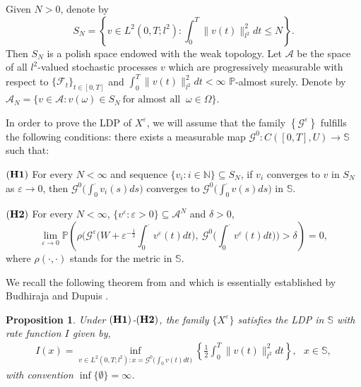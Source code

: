\documentclass[11pt]{article}
\numberwithin{equation}{section}
\theoremstyle{plain}
\newtheorem{prop}{Proposition}[section]
\def\leq{\leqslant}
\begin{document}
Given $N > 0$, denote by
\begin{equation*}
    S_N = \left\{v \in L^2(0,T; l^2): \int_{0}^T \|v(t)\|^2_{l^2} dt \leq N \right\}.
\end{equation*}
 Then $S_N$ is a polish space endowed with the weak topology.
 Let $\mathcal{A}$ be the space of all $l^2$-valued stochastic processes $v$
 which are progressively measurable with respect to $\{\mathcal{F}_t\}_{t\in [0,T]}$
 and $\int_{0}^{T} \|v(t)\|_{l^2}^2 dt < \infty$ $\mathbb{P}$-almost surely.
 Denote by
   $\mathcal{A}_N = \{ v \in \mathcal{A} : v(\omega) \in S_N\
                         \text{for almost all }\ \omega\in \Omega \}$.

 In order to prove the LDP
  of $X^\varepsilon$,
 we will assume that the family
    $\left\{\mathcal{G}^\varepsilon\right\}$
 fulfills the following conditions:
 there exists a measurable map $\mathcal{G}^0: C([0,T],U) \rightarrow \mathbb{S}$
 such that:


 $({\bf H1})$
    For every $N < \infty$ and
    sequence $\{v_i : i \in \mathbb{N} \} \subseteq S_N$,
    if   $v_i$ converges to
     $v$ in $ S_N$ as $\varepsilon \rightarrow 0$, then
       $\mathcal{G}^0 \big( \int_0^\cdot v_i(s) ds \big)$
    converges to
       $\mathcal{G}^0 \big( \int_0^\cdot v(s) ds \big)$
    in  $\mathbb{S}$.


 $({\bf H2})$
    For every $N < \infty$, $\{v^\varepsilon : \varepsilon > 0\} \subseteq \mathcal{A}^N$ and $\delta > 0$,
    $$ \lim_{\varepsilon \to 0}
             \mathbb{P}
                  \left( \rho
                             \Big( \mathcal{G}^\varepsilon
                                          \big( W + \varepsilon^{-\frac{1}{2}} \int_{0}^{\cdot} v^\varepsilon(t) dt
                                          \big), \
                                    \mathcal{G}^0
                                          \big( \int_{0}^{\cdot} v^\varepsilon(t) dt
                                          \big)
                             \Big) > \delta
                  \right)
        = 0,
    $$
 where $\rho(\cdot, \cdot)$ stands for the metric in  $\mathbb{S}$.


 We recall the following theorem
 from  \cite[Theorem 3.2]{msz2021AMO} and \cite[Theorem 4.4]{lszz2022PA}
 which is essentially   established by Budhiraja and Dupuis \cite[Theorem 4.4]{bd2000PMS}.

\begin{prop}\cite{msz2021AMO, lszz2022PA}\label{ldpth}
  Under $({\bf H1})$-$({\bf H2})$,
  the family $\{X^\varepsilon\}$ satisfies the LDP  in $\mathbb{S}$
  with rate function $I$ given by,
  \begin{align*}
       I(x) = \inf_{v \in L^2(0,T; l^2): x = \mathcal{G}^0 \big( \int_{0}^{\cdot} v(t)dt \big) }
                   \left\{ \frac{1}{2} \int_{0}^{T} \|v(t)\|_{l^2}^2 dt
                   \right\}, \ \ \   x \in \mathbb{S},
  \end{align*}
  with  convention   $\inf \{ \emptyset \} = \infty$.
\end{prop}
\end{document}
